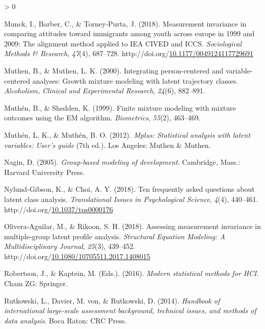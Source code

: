 \documentclass[12pt,a4paper,oneside]{reedthesis}
\newlength{\cslhangindent}
\newenvironment{CSLReferences}[2] %
 {%
  \setlength{\parindent}{0pt}
  \ifodd #1 \everypar{\setlength{\hangindent}{\cslhangindent}}\ignorespaces\fi
  \ifnum #2 > 0
  \setlength{\parskip}{#2\baselineskip}
  \fi
 }%
 {}
\begin{document}
\begin{CSLReferences}{1}{0}
\leavevmode\hypertarget{ref-munck_measurement_2018}{}%
Munck, I., Barber, C., \& Torney-Purta, J. (2018). Measurement invariance in comparing attitudes toward immigrants among youth across europe in 1999 and 2009: The alignment method applied to {IEA} {CIVED} and {ICCS}. \emph{Sociological Methods \& Research}, \emph{47}(4), 687--728. http://doi.org/\href{https://doi.org/10.1177/0049124117729691}{10.1177/0049124117729691}

\leavevmode\hypertarget{ref-muthen_integrating_2000}{}%
Muthen, B., \& Muthen, L. K. (2000). Integrating person-centered and variable-centered analyses: Growth mixture modeling with latent trajectory classes. \emph{Alcoholism, Clinical and Experimental Research}, \emph{24}(6), 882--891.

\leavevmode\hypertarget{ref-muthen_finite_1999}{}%
Muthén, B., \& Shedden, K. (1999). Finite mixture modeling with mixture outcomes using the {EM} algorithm. \emph{Biometrics}, \emph{55}(2), 463--469.

\leavevmode\hypertarget{ref-muthen_mplus_2012}{}%
Muthén, L. K., \& Muthén, B. O. (2012). \emph{Mplus: Statistical analysis with latent variables: User's guide} (7th ed.). Los Angeles: Muthen \& Muthen.

\leavevmode\hypertarget{ref-nagin_group-based_2005}{}%
Nagin, D. (2005). \emph{Group-based modeling of development}. Cambridge, Mass.: Harvard University Press.

\leavevmode\hypertarget{ref-nylund-gibson_ten_2018}{}%
Nylund-Gibson, K., \& Choi, A. Y. (2018). Ten frequently asked questions about latent class analysis. \emph{Translational Issues in Psychological Science}, \emph{4}(4), 440--461. http://doi.org/\href{https://doi.org/10.1037/tps0000176}{10.1037/tps0000176}

\leavevmode\hypertarget{ref-olivera-aguilar_assessing_2018}{}%
Olivera-Aguilar, M., \& Rikoon, S. H. (2018). Assessing measurement invariance in multiple-group latent profile analysis. \emph{Structural Equation Modeling: A Multidisciplinary Journal}, \emph{25}(3), 439--452. http://doi.org/\href{https://doi.org/10.1080/10705511.2017.1408015}{10.1080/10705511.2017.1408015}

\leavevmode\hypertarget{ref-robertson_modern_2016}{}%
Robertson, J., \& Kaptein, M. (Eds.). (2016). \emph{Modern statistical methods for {HCI}}. Cham {ZG}: Springer.

\leavevmode\hypertarget{ref-rutkowski_handbook_2014}{}%
Rutkowski, L., Davier, M. von, \& Rutkowski, D. (2014). \emph{Handbook of international large-scale assessment background, technical issues, and methods of data analysis}. Boca Raton: {CRC} Press.


\end{CSLReferences}
\end{document}
